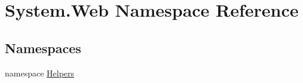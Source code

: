 \hypertarget{namespaceSystem_1_1Web}{}\section{System.\+Web Namespace Reference}
\label{namespaceSystem_1_1Web}
\subsection*{Namespaces}
\begin{DoxyCompactItemize}
\item 
namespace \hyperlink{namespaceSystem_1_1Web_1_1Helpers}{Helpers}
\end{DoxyCompactItemize}
